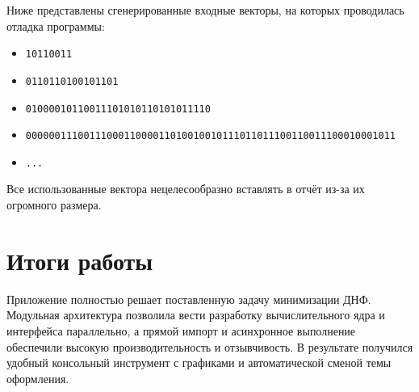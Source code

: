 \documentclass[14pt]{extarticle}
\begin{document}
Ниже представлены сгенерированные входные векторы, на которых проводилась отладка программы:

\begin{itemize}
    \item \texttt{10110011}
    \item \texttt{0110110100101101}
    \item \texttt{01000010110011101010110101011110}
    \item \texttt{0000001110011100011000011010010010111011011100110011100010001011}
    \item \texttt{...}
\end{itemize}

Все использованные вектора нецелесообразно вставлять в отчёт из-за их огромного размера. 

\section*{Итоги работы}

Приложение полностью решает поставленную задачу минимизации ДНФ. Модульная архитектура позволила вести разработку вычислительного ядра и интерфейса параллельно, а прямой импорт и асинхронное выполнение обеспечили высокую производительность и отзывчивость. В результате получился удобный консольный инструмент с графиками и автоматической сменой темы оформления.

\newpage

\printbibliography[title={Список литературы}]
\end{document}
